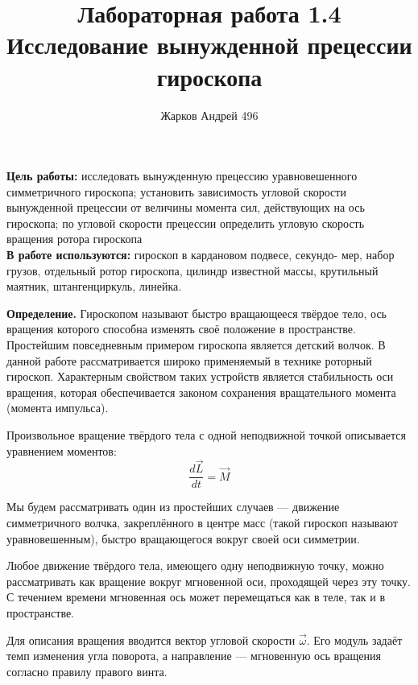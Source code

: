 \documentclass[12pt]{article}
\begin{document}
	\author {Жарков Андрей 496}
	\title {Лабораторная работа 1.4 \\ Исследование вынужденной прецессии
		гироскопа}
	\maketitle{}
	
	\indent
	\textbf{Цель работы:} исследовать вынужденную прецессию уравновешенного симметричного гироскопа; установить зависимость угловой скорости вынужденной прецессии от величины момента сил, действующих на ось гироскопа; по угловой скорости прецессии определить
	угловую скорость вращения ротора гироскопа
	\\\newline
	\indent
	\textbf{В работе используются:} гироскоп в кардановом подвесе, секундо-
	мер, набор грузов, отдельный ротор гироскопа, цилиндр известной
	массы, крутильный маятник, штангенциркуль, линейка.
	\\\newline
	
	\textbf{Определение.} Гироскопом называют быстро вращающееся твёрдое тело, ось вращения которого способна изменять своё положение в пространстве. Простейшим повседневным примером гироскопа является детский волчок.
	В данной работе рассматривается широко применяемый в технике роторный гироскоп. Характерным свойством таких устройств является
	стабильность оси вращения, которая обеспечивается законом сохранения вращательного момента (момента импульса).
	
	Произвольное вращение твёрдого тела с одной неподвижной точкой
	описывается уравнением моментов: 
	\begin{equation}
	\frac{d\vec{L}}{dt} = \vec{M}
	\end{equation}
	
	Мы будем рассматривать один из простейших случаев — движение
	симметричного волчка, закреплённого в центре масс (такой гироскоп
	называют уравновешенным), быстро вращающегося вокруг своей оси
	симметрии.
	
	Любое движение твёрдого тела, имеющего одну неподвижную точку,
	можно рассматривать как вращение вокруг мгновенной оси, проходящей через эту точку. С течением времени мгновенная ось может перемещаться как в теле, так и в пространстве.
	
	Для описания вращения вводится вектор угловой скорости $\vec{\omega}$. Его модуль задаёт темп изменения угла поворота, а направление — мгновенную ось вращения согласно правилу правого винта.
	
\end{document}
